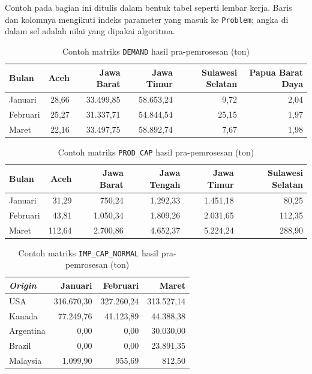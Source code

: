 \documentclass{file/TA-ITS}
\theoremstyle{definition}
\theoremstyle{definition}
\theoremstyle{plain}
\begin{document}
Contoh pada bagian ini ditulis dalam bentuk tabel seperti lembar kerja. Baris dan kolomnya mengikuti indeks parameter yang masuk ke \texttt{Problem}; angka di dalam sel adalah nilai yang dipakai algoritma.

\begin{table}[H]
\centering
\caption{Contoh matriks \texttt{DEMAND} hasil pra-pemrosesan (ton)}
\label{tab:preprocessing_demand_matrix_example}
\scriptsize
\begin{tabular}{lrrrrr}
\toprule
\textbf{Bulan} & \textbf{Aceh} & \textbf{Jawa Barat} & \textbf{Jawa Timur} & \textbf{Sulawesi Selatan} & \textbf{Papua Barat Daya} \\
\midrule
Januari & 28,66 & 33.499,85 & 58.653,24 & 9,72 & 2,04 \\
Februari & 25,27 & 31.337,71 & 54.844,54 & 25,15 & 1,97 \\
Maret & 22,16 & 33.497,75 & 58.892,74 & 7,67 & 1,98 \\
\bottomrule
\end{tabular}
\end{table}

\begin{table}[H]
\centering
\caption{Contoh matriks \texttt{PROD\_CAP} hasil pra-pemrosesan (ton)}
\label{tab:preprocessing_prod_cap_matrix_example}
\scriptsize
\begin{tabular}{lrrrrr}
\toprule
\textbf{Bulan} & \textbf{Aceh} & \textbf{Jawa Barat} & \textbf{Jawa Tengah} & \textbf{Jawa Timur} & \textbf{Sulawesi Selatan} \\
\midrule
Januari & 31,29 & 750,24 & 1.292,33 & 1.451,18 & 80,25 \\
Februari & 43,81 & 1.050,34 & 1.809,26 & 2.031,65 & 112,35 \\
Maret & 112,64 & 2.700,86 & 4.652,37 & 5.224,24 & 288,90 \\
\bottomrule
\end{tabular}
\end{table}

\begin{table}[H]
\centering
\caption{Contoh matriks \texttt{IMP\_CAP\_NORMAL} hasil pra-pemrosesan (ton)}
\label{tab:preprocessing_import_cap_matrix_example}
\scriptsize
\begin{tabular}{lrrr}
\toprule
\textbf{\textit{Origin}} & \textbf{Januari} & \textbf{Februari} & \textbf{Maret} \\
\midrule
USA & 316.670,30 & 327.260,24 & 313.527,14 \\
Kanada & 77.249,76 & 41.123,89 & 44.388,38 \\
Argentina & 0,00 & 0,00 & 30.030,00 \\
Brazil & 0,00 & 0,00 & 23.891,35 \\
Malaysia & 1.099,90 & 955,69 & 812,50 \\
\bottomrule
\end{tabular}
\end{table}
\end{document}
